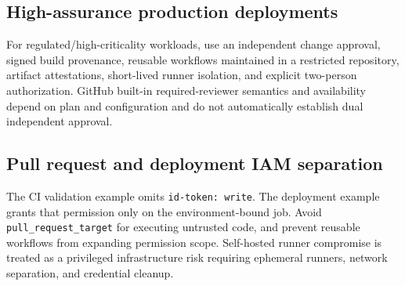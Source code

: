 \documentclass[10pt,letterpaper]{article}
\begin{document}
\subsection{High-assurance production deployments}
For regulated/high-criticality workloads, use an independent change approval, signed build provenance, reusable workflows maintained in a restricted repository, artifact attestations, short-lived runner isolation, and explicit two-person authorization. GitHub built-in required-reviewer semantics and availability depend on plan and configuration and do not automatically establish dual independent approval.
\subsection{Pull request and deployment IAM separation}
The CI validation example omits \texttt{id-token: write}. The deployment example grants that permission only on the environment-bound job. Avoid \texttt{pull\_request\_target} for executing untrusted code, and prevent reusable workflows from expanding permission scope. Self-hosted runner compromise is treated as a privileged infrastructure risk requiring ephemeral runners, network separation, and credential cleanup.
\end{document}
